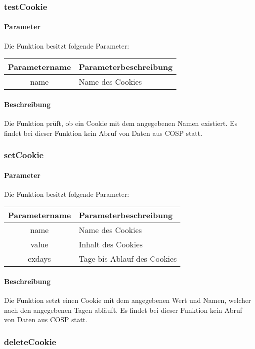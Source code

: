 \subsubsection{testCookie}
\paragraph{Parameter} Die Funktion besitzt folgende Parameter:
\begin{table}[H]
	\begin{tabular}{|c|p{11cm}|}
		\hline
		\textbf{Parametername} & \textbf{Parameterbeschreibung} \\ \hline
		name & Name des Cookies \\ \hline
	\end{tabular}
\end{table}
\paragraph{Beschreibung} Die Funktion prüft, ob ein Cookie mit dem angegebenen Namen existiert. Es findet bei dieser Funktion kein Abruf von Daten aus {\glqq COSP\grqq} statt.
\subsubsection{setCookie}
\paragraph{Parameter} Die Funktion besitzt folgende Parameter:
\begin{table}[H]
	\begin{tabular}{|c|p{11cm}|}
		\hline
		\textbf{Parametername} & \textbf{Parameterbeschreibung} \\ \hline
		name & Name des Cookies \\ \hline
		value & Inhalt des Cookies \\ \hline
		exdays & Tage bis Ablauf des Cookies \\ \hline
	\end{tabular}
\end{table}
\paragraph{Beschreibung} Die Funktion setzt einen Cookie mit dem angegebenen Wert und Namen, welcher nach den angegebenen Tagen abläuft. Es findet bei dieser Funktion kein Abruf von Daten aus {\glqq COSP\grqq} statt.
\subsubsection{deleteCookie}
